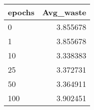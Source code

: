 \begin{tabular}{lr}
\toprule
epochs &  Avg\_waste \\
\midrule
     0 &   3.855678 \\
     1 &   3.855678 \\
    10 &   3.338383 \\
    25 &   3.372731 \\
    50 &   3.364911 \\
   100 &   3.902451 \\
\bottomrule
\end{tabular}
